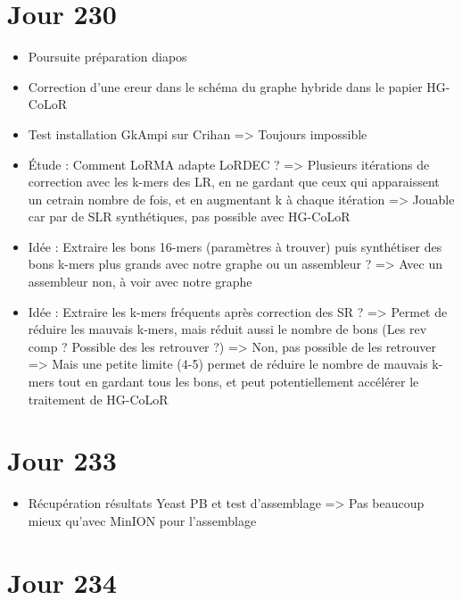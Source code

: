 \documentclass[12pt]{report}
\begin{document}
\section{Jour 230}

\begin{itemize}
	\item Poursuite préparation diapos
	
	\item Correction d'une ereur dans le schéma du graphe hybride dans le papier HG-CoLoR
	
	\item Test installation GkAmpi sur Crihan => Toujours impossible
	
	\item Étude : Comment LoRMA adapte LoRDEC ? => Plusieurs itérations de correction avec les k-mers des LR,
		  en ne gardant que ceux qui apparaissent un cetrain nombre de fois, et en augmentant k à chaque itération
		  => Jouable car par de SLR synthétiques, pas possible avec HG-CoLoR
		  
	\item Idée : Extraire les bons 16-mers (paramètres à trouver) puis synthétiser des bons k-mers plus grands
		  avec notre graphe ou un assembleur ?
		  => Avec un assembleur non, à voir avec notre graphe
		  
	\item Idée : Extraire les k-mers fréquents après correction des SR ?
		  => Permet de réduire les mauvais k-mers, mais réduit aussi le nombre de bons (Les rev comp ? Possible des les retrouver ?)
		  		=> Non, pas possible de les retrouver
		  => Mais une petite limite (4-5) permet de réduire le nombre de mauvais k-mers tout en gardant tous les bons, et peut potentiellement
		  	 accélérer le traitement de HG-CoLoR 
\end{itemize}

\section{Jour 233}

\begin{itemize}
	\item Récupération résultats Yeast PB et test d'assemblage => Pas beaucoup mieux qu'avec MinION pour l'assemblage
\end{itemize}

\section{Jour 234}
\end{document}
